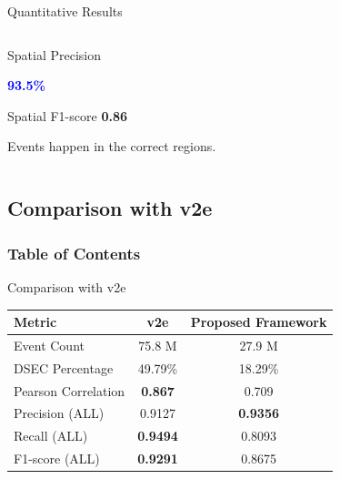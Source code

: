 \documentclass[10pt,xcolor=x11names,compress]{beamer}
\begin{document}
\begin{frame}{Quantitative Results}
\begin{columns}[T]
\begin{block}{Spatial Precision}
\begin{center}
        {\fontsize{20}{20}\selectfont
          \textcolor{blue}{\textbf{93.5\%}}}

      \end{center}


      \centering
      \small
      Spatial F1-score \textbf{0.86}

      Events happen in the correct regions.

    \end{block}

  \end{columns}

\end{frame}

\subsection{Comparison with v2e}

\begin{frame}
  \frametitle{\textbf{Table of Contents}}
  \tableofcontents[
  hideallsubsections=false
  sectionstyle=show/shaded,    
  subsectionstyle=show/shaded/hide, 
  section=1-100                
  ]
\end{frame}

\begin{frame}{Comparison with v2e}

\centering
\small

\renewcommand{\arraystretch}{1.2}

\begin{tabular}{lcc}
\rowcolor{colorLeft}
\color{white}\textbf{Metric} &
\color{white}\textbf{v2e} &
\color{white}\textbf{Proposed Framework} \\
\hline
Event Count         & 75.8 M          & 27.9 M \\
DSEC Percentage     & 49.79\%         & 18.29\% \\
Pearson Correlation & \textbf{0.867}  & 0.709 \\
Precision (ALL)     & 0.9127          & \textbf{0.9356} \\
Recall (ALL)        & \textbf{0.9494} & 0.8093 \\
F1-score (ALL)      & \textbf{0.9291} & 0.8675 \\
\end{tabular}

\vspace{0.45cm}
\end{frame}
\end{document}
